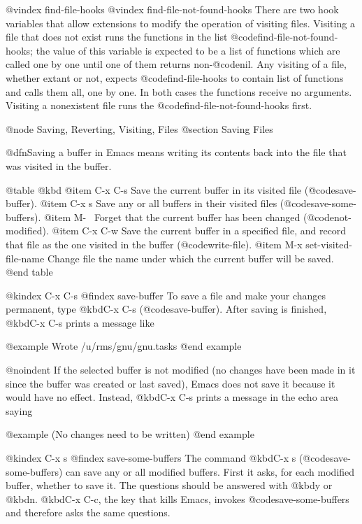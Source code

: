 {{{{{{{{{{{{{{{{@vindex find-file-hooks
@vindex find-file-not-found-hooks
  There are two hook variables that allow extensions to modify the
operation of visiting files.  Visiting a file that does not exist runs the
functions in the list @code{find-file-not-found-hooks}; the value of this
variable is expected to be a list of functions which are
called one by one until one of them returns non-@code{nil}.  Any visiting
of a file, whether extant or not, expects @code{find-file-hooks} to
contain list of functions and calls them all, one by one.  In both cases
the functions receive no arguments.  Visiting a nonexistent file
runs the @code{find-file-not-found-hooks} first.

@node Saving, Reverting, Visiting, Files
@section Saving Files

  @dfn{Saving} a buffer in Emacs means writing its contents back into the file
that was visited in the buffer.

@table @kbd
@item C-x C-s
Save the current buffer in its visited file (@code{save-buffer}).
@item C-x s
Save any or all buffers in their visited files (@code{save-some-buffers}).
@item M-~
Forget that the current buffer has been changed (@code{not-modified}).
@item C-x C-w
Save the current buffer in a specified file, and record that file as
the one visited in the buffer (@code{write-file}).
@item M-x set-visited-file-name
Change file the name under which the current buffer will be saved.
@end table

@kindex C-x C-s
@findex save-buffer
  To save a file and make your changes permanent, type
@kbd{C-x C-s} (@code{save-buffer}).  After saving is finished, @kbd{C-x C-s}
prints a message like

@example
Wrote /u/rms/gnu/gnu.tasks
@end example

@noindent
If the selected buffer is not modified (no changes have been made in it
since the buffer was created or last saved), Emacs does not save it
because it would have no effect.  Instead, @kbd{C-x C-s} prints a message
in the echo area saying

@example
(No changes need to be written)
@end example

@kindex C-x s
@findex save-some-buffers
  The command @kbd{C-x s} (@code{save-some-buffers}) can save any or all
modified buffers.  First it asks, for each modified buffer, whether to
save it.  The questions should be answered with @kbd{y} or @kbd{n}.
@kbd{C-x C-c}, the key that kills Emacs, invokes
@code{save-some-buffers} and therefore asks the same questions.

}}}}}}}}}}}}}}}}
